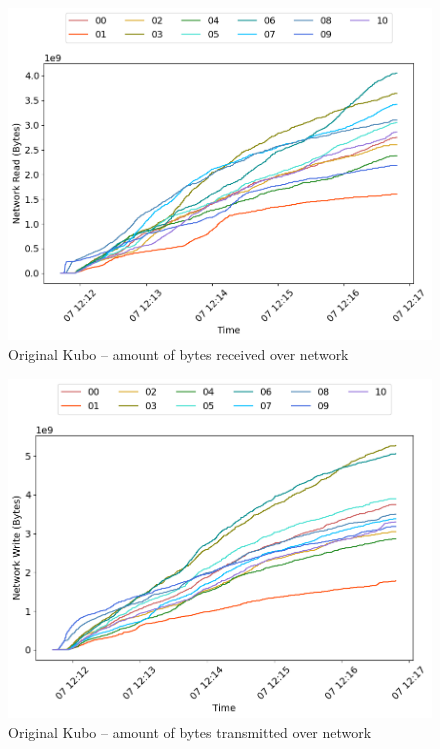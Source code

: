 \begin{minipage}{0.5\linewidth}
\begin{figure}[H]
\captionsetup{justification=centering,width=0.8\linewidth}
\includegraphics[width=\linewidth]{figures/original/net_read.png}
\caption{Original Kubo -- amount of bytes received over network}
\label{fig:original-net_read}
\end{figure}
\end{minipage}
\begin{minipage}{0.5\linewidth}
\begin{figure}[H]
\captionsetup{justification=centering,width=0.8\linewidth}
\includegraphics[width=\linewidth]{figures/original/net_write.png}
\caption{Original Kubo -- amount of bytes transmitted over network}
\label{fig:original-net_write}
\end{figure}
\end{minipage}

